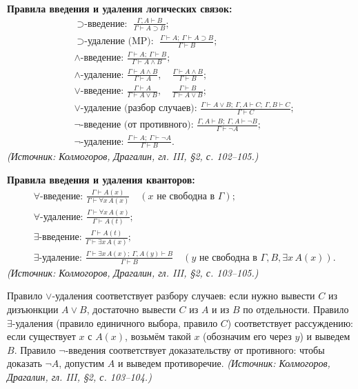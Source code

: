 \documentclass[a4paper,12pt]{article}
\begin{document}
\textbf{Правила введения и удаления логических связок:}
\[
\begin{aligned}
&\text{\(\supset\)-введение: } \frac{\Gamma,A\vdash B}{\Gamma\vdash A\supset B};\\
&\text{\(\supset\)-удаление (MP): } \frac{\Gamma\vdash A;\ \Gamma\vdash A\supset B}{\Gamma\vdash B};\\
&\text{\(\wedge\)-введение: } \frac{\Gamma\vdash A;\ \Gamma\vdash B}{\Gamma\vdash A\wedge B};\\
&\text{\(\wedge\)-удаление: } \frac{\Gamma\vdash A\wedge B}{\Gamma\vdash A},\quad \frac{\Gamma\vdash A\wedge B}{\Gamma\vdash B};\\
&\text{\(\vee\)-введение: } \frac{\Gamma\vdash A}{\Gamma\vdash A\vee B},\quad \frac{\Gamma\vdash B}{\Gamma\vdash A\vee B};\\
&\text{\(\vee\)-удаление (разбор случаев): } \frac{\Gamma\vdash A\vee B;\ \Gamma,A\vdash C;\ \Gamma,B\vdash C}{\Gamma\vdash C};\\
&\text{\(\neg\)-введение (от противного): } \frac{\Gamma,A\vdash B;\ \Gamma,A\vdash\neg B}{\Gamma\vdash\neg A};\\
&\text{\(\neg\)-удаление: } \frac{\Gamma\vdash A;\ \Gamma\vdash\neg A}{\Gamma\vdash B}.
\end{aligned}
\]
\textit{(Источник: Колмогоров, Драгалин, гл. III, §2, с. 102--105.)}

\textbf{Правила введения и удаления кванторов:}
\[
\begin{aligned}
&\text{\(\forall\)-введение: } \frac{\Gamma\vdash A(x)}{\Gamma\vdash\forall x\,A(x)} \quad (x\text{ не свободна в }\Gamma);\\
&\text{\(\forall\)-удаление: } \frac{\Gamma\vdash\forall x\,A(x)}{\Gamma\vdash A(t)};\\
&\text{\(\exists\)-введение: } \frac{\Gamma\vdash A(t)}{\Gamma\vdash\exists x\,A(x)};\\
&\text{\(\exists\)-удаление: } \frac{\Gamma\vdash\exists x\,A(x);\ \Gamma,A(y)\vdash B}{\Gamma\vdash B} \quad (y\text{ не свободна в }\Gamma,B,\exists x\,A(x)).
\end{aligned}
\]
\textit{(Источник: Колмогоров, Драгалин, гл. III, §2, с. 103--105.)}

Правило \(\vee\)-удаления соответствует разбору случаев: если нужно вывести \(C\) из дизъюнкции \(A\vee B\), достаточно вывести \(C\) из \(A\) и из \(B\) по отдельности. Правило \(\exists\)-удаления (правило единичного выбора, правило \(C\)) соответствует рассуждению: если существует \(x\) с \(A(x)\), возьмём такой \(x\) (обозначим его через \(y\)) и выведем \(B\). Правило \(\neg\)-введения соответствует доказательству от противного: чтобы доказать \(\neg A\), допустим \(A\) и выведем противоречие.
\textit{(Источник: Колмогоров, Драгалин, гл. III, §2, с. 103--104.)}
\end{document}
